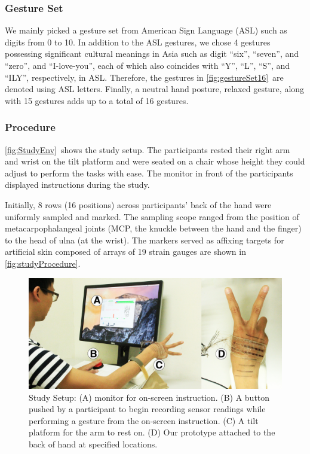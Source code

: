 \documentclass{sigchi}
\begin{document}
\subsubsection{Gesture Set}
We mainly picked a gesture set from American Sign Language (ASL) such as digits from 0 to 10. In addition to the ASL gestures, we chose 4 gestures possessing significant cultural meanings in Asia such as digit ``six'', ``seven'', and ``zero'', and ``I-love-you'', each of which also coincides with ``Y'', ``L'', ``S'', and ``ILY'', respectively, in ASL. Therefore, the gestures in \autoref{fig:gestureSet16}\ are denoted using ASL letters. Finally, a neutral hand posture, relaxed gesture, along with 15 gestures adds up to a total of 16 gestures.

\subsubsection{Procedure}
\autoref{fig:StudyEnv}\ shows the study setup. The participants rested their right arm and wrist on the tilt platform and were seated on a chair whose height they could adjust to perform the tasks with ease. The monitor in front of the participants displayed instructions during the study.

Initially, 8 rows (16 positions) across participants’ back of the hand were uniformly sampled and marked. The sampling scope ranged from the position of metacarpophalangeal joints (MCP, the knuckle between the hand and the finger) to the head of ulna (at the wrist).%
 The markers served as affixing targets for artificial skin composed of arrays of 19 strain gauges are shown in \autoref{fig:studyProcedure}.

\begin{figure}[t]
  \includegraphics[width=1\columnwidth]{figures/StudyEnv.jpg}
  \caption{Study Setup:
            (A) monitor for on-screen instruction.
            (B) A button pushed by a participant to begin recording sensor readings while performing a gesture from the on-screen instruction.
            (C) A tilt platform for the arm to rest on.
            (D) Our prototype attached to the back of hand at specified locations. }
  \label{fig:StudyEnv}
\end{figure}
\end{document}
